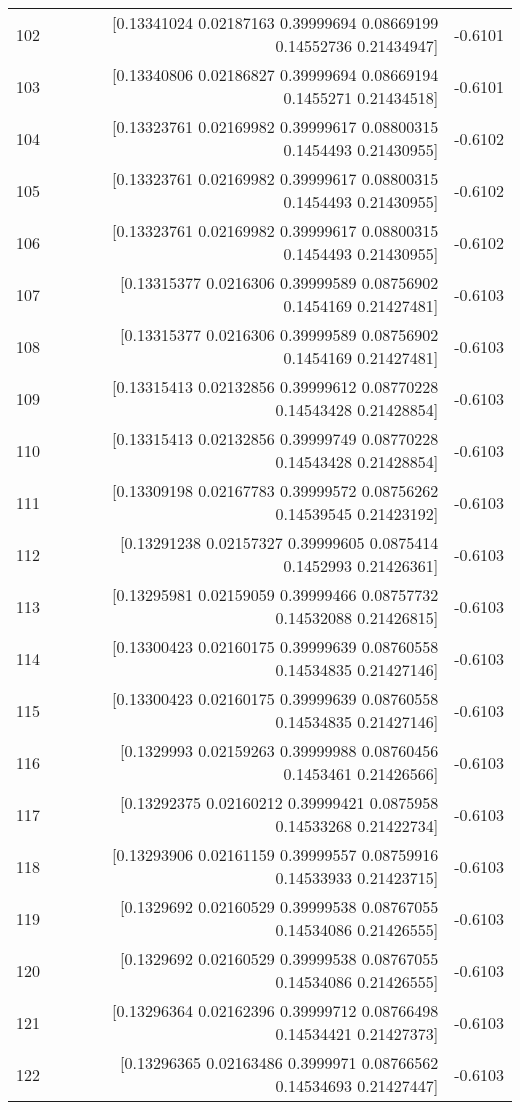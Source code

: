 \begin{longtable}{lrr}
102 & [0.13341024 0.02187163 0.39999694 0.08669199 0.14552736 0.21434947] & -0.6101 \\
103 & [0.13340806 0.02186827 0.39999694 0.08669194 0.1455271  0.21434518] & -0.6101 \\
104 & [0.13323761 0.02169982 0.39999617 0.08800315 0.1454493  0.21430955] & -0.6102 \\
105 & [0.13323761 0.02169982 0.39999617 0.08800315 0.1454493  0.21430955] & -0.6102 \\
106 & [0.13323761 0.02169982 0.39999617 0.08800315 0.1454493  0.21430955] & -0.6102 \\
107 & [0.13315377 0.0216306  0.39999589 0.08756902 0.1454169  0.21427481] & -0.6103 \\
108 & [0.13315377 0.0216306  0.39999589 0.08756902 0.1454169  0.21427481] & -0.6103 \\
109 & [0.13315413 0.02132856 0.39999612 0.08770228 0.14543428 0.21428854] & -0.6103 \\
110 & [0.13315413 0.02132856 0.39999749 0.08770228 0.14543428 0.21428854] & -0.6103 \\
111 & [0.13309198 0.02167783 0.39999572 0.08756262 0.14539545 0.21423192] & -0.6103 \\
112 & [0.13291238 0.02157327 0.39999605 0.0875414  0.1452993  0.21426361] & -0.6103 \\
113 & [0.13295981 0.02159059 0.39999466 0.08757732 0.14532088 0.21426815] & -0.6103 \\
114 & [0.13300423 0.02160175 0.39999639 0.08760558 0.14534835 0.21427146] & -0.6103 \\
115 & [0.13300423 0.02160175 0.39999639 0.08760558 0.14534835 0.21427146] & -0.6103 \\
116 & [0.1329993  0.02159263 0.39999988 0.08760456 0.1453461  0.21426566] & -0.6103 \\
117 & [0.13292375 0.02160212 0.39999421 0.0875958  0.14533268 0.21422734] & -0.6103 \\
118 & [0.13293906 0.02161159 0.39999557 0.08759916 0.14533933 0.21423715] & -0.6103 \\
119 & [0.1329692  0.02160529 0.39999538 0.08767055 0.14534086 0.21426555] & -0.6103 \\
120 & [0.1329692  0.02160529 0.39999538 0.08767055 0.14534086 0.21426555] & -0.6103 \\
121 & [0.13296364 0.02162396 0.39999712 0.08766498 0.14534421 0.21427373] & -0.6103 \\
122 & [0.13296365 0.02163486 0.3999971  0.08766562 0.14534693 0.21427447] & -0.6103 \\

\end{longtable}
